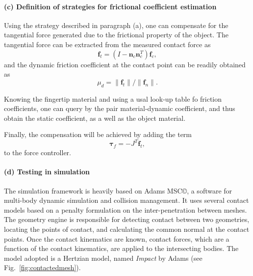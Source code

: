

\paragraph{(c) Definition of strategies for frictional coefficient estimation}
Using the strategy described in paragraph (a), one can compensate for the tangential force generated due to the frictional property of the object. The tangential force can be extracted from the measured contact force as
\begin{equation}
    \mathbf{f}_t = (I-\mathbf{n}_{c}\mathbf{n}^T_{c})\mathbf{f}_c,
\end{equation}
and the dynamic friction coefficient at the contact point can be readily obtained as
\begin{equation}
    \mu_{d} = \lVert{\mathbf{f}_{t}}\rVert/\lVert{\mathbf{f}_{n}}\rVert.
\end{equation}

Knowing the fingertip material and using a usal look-up table fo friction coefficients, one can query by the pair material-dynamic coefficient, and thus obtain the static coefficient, as a well as the object material.

Finally, the compensation will be achieved by adding the term
\begin{equation}
    \boldsymbol{\tau}_f=-J^T \mathbf{f}_t,
\end{equation}
to the force controller.

\paragraph{(d) Testing in simulation}
The simulation framework is heavily based on Adams MSC\copyright, a software for multi-body dynamic simulation and collision management. It uses several contact models based on a penalty formulation on the inter-penetration between meshes. The geometry engine is responsible for detecting contact between two geometries, locating the points of contact, and calculating the common normal at the contact points. Once the contact kinematics are known, contact forces, which are a function of the contact kinematics, are applied to the intersecting bodies. The model adopted is a Hertzian model, named \emph{Impact} by Adams (see Fig.~\ref{fig:contactedmesh}).

